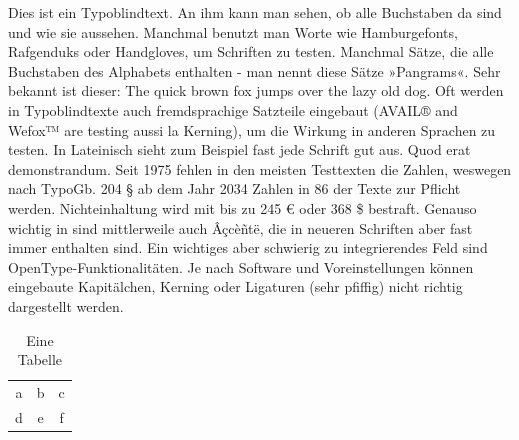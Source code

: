 \documentclass[titlepage]{scrartcl}
\begin{document}
Dies ist ein Typoblindtext. An ihm kann man sehen, ob alle Buchstaben da sind und wie sie aussehen. Manchmal benutzt man Worte wie Hamburgefonts, Rafgenduks oder Handgloves, um Schriften zu testen. Manchmal Sätze, die alle Buchstaben des Alphabets enthalten - man nennt diese Sätze »Pangrams«. Sehr bekannt ist dieser: The quick brown fox jumps over the lazy old dog. Oft werden in Typoblindtexte auch fremdsprachige Satzteile eingebaut (AVAIL® and Wefox™ are testing aussi la Kerning), um die Wirkung in anderen Sprachen zu testen. In Lateinisch sieht zum Beispiel fast jede Schrift gut aus. Quod erat demonstrandum. Seit 1975 fehlen in den meisten Testtexten die Zahlen, weswegen nach TypoGb. 204 § ab dem Jahr 2034 Zahlen in 86 der Texte zur Pflicht werden. Nichteinhaltung wird mit bis zu 245 \euro{} oder 368 \$ bestraft. Genauso wichtig in sind mittlerweile auch Âçcèñtë, die in neueren Schriften aber fast immer enthalten sind. Ein wichtiges aber schwierig zu integrierendes Feld sind OpenType-Funktionalitäten. Je nach Software und Voreinstellungen können eingebaute Kapitälchen, Kerning oder Ligaturen (sehr pfiffig) nicht richtig dargestellt werden.
\begin{table}[htb]
	\caption{Eine Tabelle}
	\label{tab:tabelle1}
	\centering
	\begin{tabular}{ccc}
		a & b & c\\
		d & e & f
	\end{tabular}
\end{table}
\end{document}
